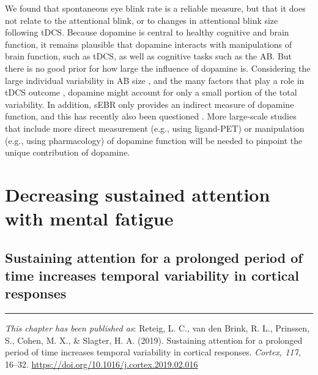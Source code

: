 \documentclass[11pt,]{memoir}
\begin{document}
We found that spontaneous eye blink rate is a reliable measure, but that it does not relate to the attentional blink, or to changes in attentional blink size following tDCS. Because dopamine is central to healthy cognitive and brain function, it remains plausible that dopamine interacts with manipulations of brain function, such as tDCS, as well as cognitive tasks such as the AB. But there is no good prior for how large the influence of dopamine is. Considering the large individual variability in AB size \autocite{Willems2016}, and the many factors that play a role in tDCS outcome \autocites{Li2015b}{Krause2014}, dopamine might account for only a small portion of the total variability. In addition, sEBR only provides an indirect measure of dopamine function, and this has recently also been questioned \autocites{Dang2017}{Sescousse2018}. More large-scale studies that include more direct measurement (e.g., using ligand-PET) or manipulation (e.g., using pharmacology) of dopamine function will be needed to pinpoint the unique contribution of dopamine.

\hypertarget{part-MF}{%
\part{Decreasing sustained attention with mental fatigue}\label{part-MF}}

\hypertarget{MFBrain}{%
\chapter{Sustaining attention for a prolonged period of time increases temporal variability in cortical responses}\label{MFBrain}}


\vspace*{\fill}

\begin{center}\rule{0.5\linewidth}{\linethickness}\end{center}

\small

\noindent
\emph{This chapter has been published as}: Reteig, L. C., van den Brink, R. L., Prinssen, S., Cohen, M. X., \& Slagter, H. A. (2019). Sustaining attention for a prolonged period of time increases temporal variability in cortical responses. \emph{Cortex, 117}, 16--32. \url{https://doi.org/10.1016/j.cortex.2019.02.016}
\newpage
\normalsize
\end{document}
